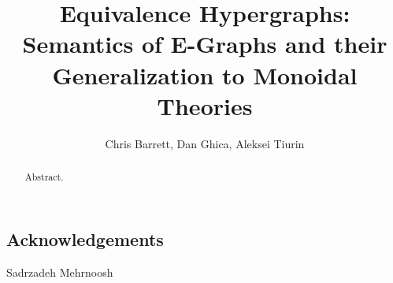 \documentclass
  [ acmsmall
  , pdftex
  , dvipsnames
  , review
  , nonacm
  , screen
  , authordraft
  ]{acmart}
\title{Equivalence Hypergraphs:\\ Semantics of E-Graphs and their Generalization to 
Monoidal Theories}
\author{Chris Barrett, Dan Ghica, Aleksei Tiurin}
\begin{document}
\begin{abstract}
Abstract.
\end{abstract}

\maketitle


% 








\subsection*{Acknowledgements}
Sadrzadeh Mehrnoosh 

\clearpage


\end{document}
